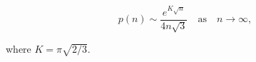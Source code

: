 $$p(n) \sim \frac{e^{K\sqrt{n}}}{4n\sqrt{3}} \quad \text{as} \quad n \to \infty,$$

where $K = \pi\sqrt{2/3}$.
